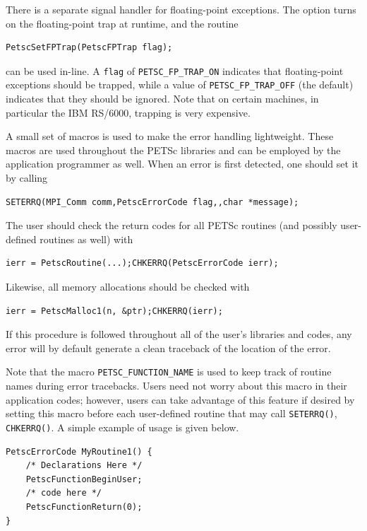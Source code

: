 {{{There is a separate signal handler for floating-point exceptions.
 
The option  turns on the floating-point trap at runtime,
and the routine  
\begin{lstlisting}
PetscSetFPTrap(PetscFPTrap flag);
\end{lstlisting}
can be used in-line.
A \lstinline{flag} of \lstinline{PETSC_FP_TRAP_ON} 
indicates that floating-point exceptions should be trapped,
while a value of \lstinline{PETSC_FP_TRAP_OFF} (the default) indicates that they
should be ignored.  Note that on certain machines, in particular
the IBM RS/6000, trapping is very expensive.

A small set of macros is used to make the error handling lightweight.
These macros are used throughout the PETSc libraries and can be employed
by the application   
programmer as well.  When an error is first detected,
one should set it by calling
\begin{lstlisting}
SETERRQ(MPI_Comm comm,PetscErrorCode flag,,char *message);
\end{lstlisting}
The user should check the return codes for all PETSc routines (and
possibly user-defined routines as well) with
\begin{lstlisting}
ierr = PetscRoutine(...);CHKERRQ(PetscErrorCode ierr);
\end{lstlisting}
Likewise, all memory allocations should be checked with
\begin{lstlisting}
ierr = PetscMalloc1(n, &ptr);CHKERRQ(ierr);
\end{lstlisting}
If this procedure is followed throughout all of the user's libraries
and codes, any error will by default generate a clean traceback of
the location  
of the error.

Note that the macro \lstinline{PETSC_FUNCTION_NAME} is used to keep track of
routine names during error tracebacks.  Users need not worry about this
macro in their application codes; however, users can take advantage of this feature
if desired by setting this macro before each user-defined routine
that may call \lstinline{SETERRQ()}, \lstinline{CHKERRQ()}.
A simple example of usage is given below.
\begin{lstlisting}
PetscErrorCode MyRoutine1() {
    /* Declarations Here */
    PetscFunctionBeginUser;
    /* code here */
    PetscFunctionReturn(0);
}
\end{lstlisting}

}}}
